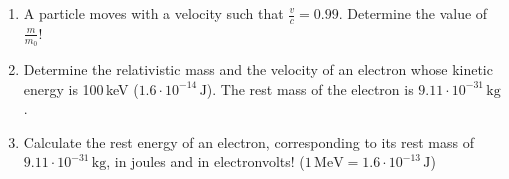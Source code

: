 \documentclass[a4paper,12pt]{letter}
\begin{document}
\begin{enumerate}[label=\Roman*.]
\begin{enumerate}[label=\arabic*.]
\item A particle moves with a velocity such that $ \frac{v}{c} = 0.99 $.  Determine the value of $ \frac{m}{m_0} $!

\item Determine the relativistic mass and the velocity of an electron whose kinetic energy is 100\,keV ($ 1.6 \cdot 10^{-14} \, \text{J} $).  The rest mass of the electron is $ 9.11 \cdot 10^{-31} \, \text{kg} $.

\item Calculate the rest energy of an electron, corresponding to its rest mass of $ 9.11 \cdot 10^{-31} \, \text{kg} $, in joules and in electronvolts!  ($ 1 \, \text{MeV} = 1.6 \cdot 10^{-13} \, \text{J} $)

\end{enumerate}

\end{enumerate}

\bigskip


\vfill
\end{document}
